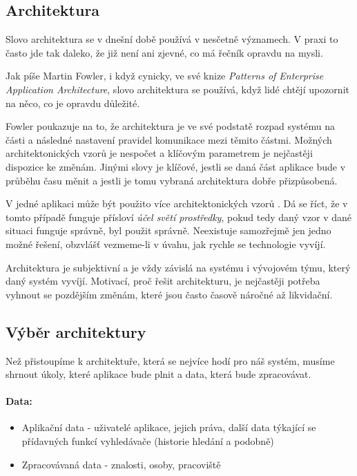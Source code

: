\subsection{Architektura}
Slovo architektura se v dnešní době používá v nesčetně významech. V praxi to často jde tak daleko, že již není ani zjevné, co má řečník opravdu na mysli.\par
Jak píše Martin Fowler, i když cynicky, ve své knize \textit{Patterns of Enterprise Application Architecture}, slovo architektura se používá, když lidé chtějí upozornit na něco, co je opravdu důležité. \cite{fowler-patterns}\par
Fowler poukazuje na to, že architektura je ve své podstatě rozpad systému na části a následné nastavení pravidel komunikace mezi těmito částmi. Možných architektonických vzorů je nespočet a klíčovým parametrem je nejčastěji dispozice ke změnám. Jinými slovy je klíčové, jestli se daná část aplikace bude v průběhu času měnit a jestli je tomu vybraná architektura dobře přizpůsobená. \cite{fowler-patterns}\par
V jedné aplikaci může být použito více architektonických vzorů \cite{fowler-patterns}. Dá se říct, že v tomto případě funguje přísloví \textit{účel světí prostředky}, pokud tedy daný vzor v dané situaci funguje správně, byl použit správně. Neexistuje samozřejmě jen jedno možné řešení, obzvlášť vezmeme-li v úvahu, jak rychle se technologie vyvíjí.\par
Architektura je subjektivní a je vždy závislá na systému i vývojovém týmu, který daný systém vyvíjí. \cite{fowler-patterns} Motivací, proč řešit architekturu, je nejčastěji potřeba vyhnout se pozdějším změnám, které jsou často časově náročné až likvidační.
\subsection{Výběr architektury}
Než přistoupíme k architektuře, která se nejvíce hodí pro náš systém, musíme shrnout úkoly, které aplikace bude plnit a data, která bude zpracovávat.
\paragraph{Data:}
\begin{itemize}
    \item Aplikační data - uživatelé aplikace, jejich práva, další data týkající se přídavných funkcí vyhledávače (historie hledání a podobně) 
    \item Zpracovávaná data - znalosti, osoby, pracoviště
\end{itemize}
